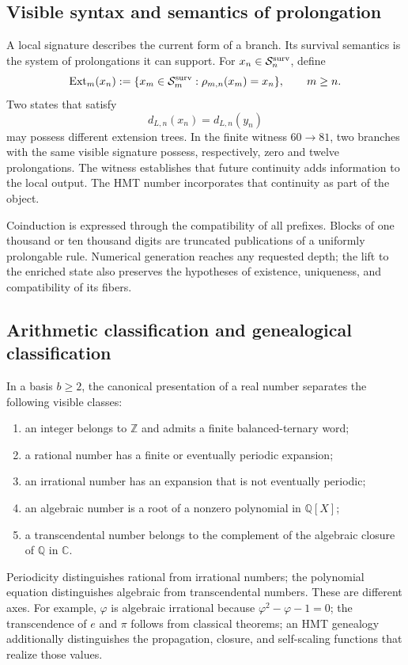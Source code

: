 \subsection{Visible syntax and semantics of prolongation}

A local signature describes the current form of a branch. Its survival
semantics is the system of prolongations it can support. For
\(x_n\in\mathcal S_n^{\rm surv}\), define
\[
 \operatorname{Ext}_m(x_n)
 :=\{x_m\in\mathcal S_m^{\rm surv}:\rho_{m,n}(x_m)=x_n\},
 \qquad m\geq n.
\]
Two states that satisfy
\[
 d_{L,n}(x_n)=d_{L,n}(y_n)
\]
may possess different extension trees. In the finite witness
\(60\to81\), two branches with the same visible signature possess, respectively,
zero and twelve prolongations. The witness establishes that future continuity
adds information to the local output. The HMT number incorporates that continuity
as part of the object.

Coinduction is expressed through the compatibility of all prefixes.
Blocks of one thousand or ten thousand digits are truncated publications of a
uniformly prolongable rule. Numerical generation reaches any
requested depth; the lift to the enriched state also preserves
the hypotheses of existence, uniqueness, and compatibility of its fibers.

\subsection{Arithmetic classification and genealogical classification}

In a basis \(b\geq2\), the canonical presentation of a real number
separates the following visible classes:
\begin{enumerate}
\item an integer belongs to \(\mathbb Z\) and admits a finite balanced-ternary word;
\item a rational number has a finite or eventually periodic expansion;
\item an irrational number has an expansion that is not eventually periodic;
\item an algebraic number is a root of a nonzero polynomial in \(\mathbb Q[X]\);
\item a transcendental number belongs to the complement of the algebraic closure of
      \(\mathbb Q\) in \(\mathbb C\).
\end{enumerate}
Periodicity distinguishes rational from irrational numbers; the polynomial equation distinguishes algebraic from transcendental numbers. These are different axes. For example, \(\varphi\) is algebraic irrational because \(\varphi^2-\varphi-1=0\); the transcendence of \(e\) and \(\pi\) follows from classical theorems; an HMT genealogy additionally distinguishes the propagation, closure, and self-scaling functions that realize those values.

